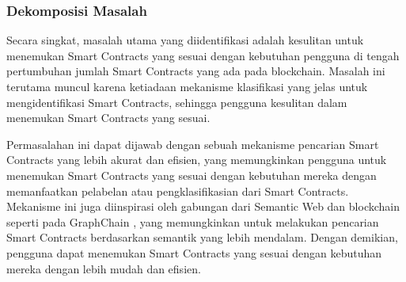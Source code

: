\subsubsection{Dekomposisi Masalah}
\label{subsubsec:dekomposisi-masalah}


Secara singkat, masalah utama yang diidentifikasi adalah kesulitan untuk menemukan Smart Contracts yang sesuai dengan kebutuhan pengguna di tengah pertumbuhan jumlah Smart Contracts yang ada pada blockchain. Masalah ini terutama muncul karena ketiadaan mekanisme klasifikasi yang jelas untuk mengidentifikasi Smart Contracts, sehingga pengguna kesulitan dalam menemukan Smart Contracts yang sesuai.

Permasalahan ini dapat dijawab dengan sebuah mekanisme pencarian Smart Contracts yang lebih akurat dan efisien, yang memungkinkan pengguna untuk menemukan Smart Contracts yang sesuai dengan kebutuhan mereka dengan memanfaatkan pelabelan atau pengklasifikasian dari Smart Contracts. Mekanisme ini juga diinspirasi oleh gabungan dari Semantic Web dan blockchain seperti pada GraphChain \parencite{sopek2018graphchain}, yang memungkinkan untuk melakukan pencarian Smart Contracts berdasarkan semantik yang lebih mendalam. Dengan demikian, pengguna dapat menemukan Smart Contracts yang sesuai dengan kebutuhan mereka dengan lebih mudah dan efisien.

